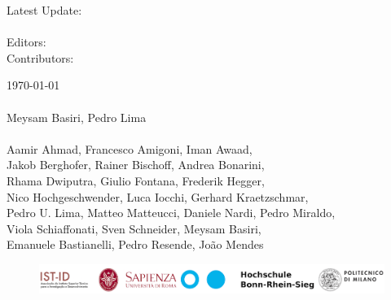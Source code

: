 \vfill
\noindent
\begin{minipage}[t]{0.18\textwidth}
\flushleft
	Latest Update:\\
	\mbox{~}\\
	Editors:\\[3.0ex]
	Contributors:\\
\end{minipage}%
\hspace*{3mm}
\begin{minipage}[t]{0.8\textwidth}
\flushleft
	\today\\
	\mbox{~}\\
	Meysam Basiri, Pedro Lima \\
	~\\
	Aamir Ahmad, Francesco Amigoni, Iman Awaad,\\ 
	Jakob Berghofer, Rainer Bischoff, Andrea Bonarini,\\
	Rhama Dwiputra, Giulio Fontana, Frederik Hegger,\\
	Nico Hochgeschwender, Luca Iocchi, Gerhard Kraetzschmar,\\
	Pedro U. Lima,	Matteo Matteucci, Daniele Nardi, Pedro Miraldo,\\
	Viola Schiaffonati, Sven Schneider,  Meysam Basiri,\\
	Emanuele Bastianelli, Pedro Resende, Jo\~ao Mendes\\
\end{minipage}
\hfill

\vfill
\vspace*{-10mm}
\begin{figure}[b]
	\centering
	\includegraphics[height=\institutionLogoHeight*2/5]{./fig/logos/ERL-CSR_logos.pdf}
\end{figure}